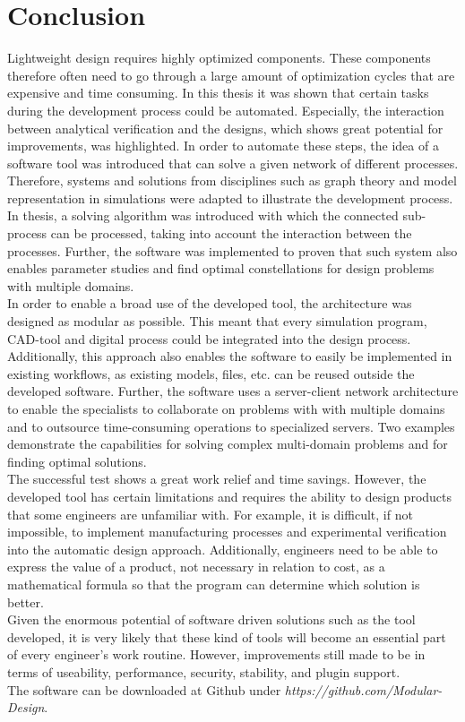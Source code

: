 \section{Conclusion}

Lightweight design requires highly optimized components.
These components therefore often need to go through a large amount of optimization cycles that are expensive and time consuming.
In this thesis it was shown that certain tasks during the development process could be automated.
Especially, the interaction between analytical verification and the designs, which shows great potential for improvements, was highlighted.
In order to automate these steps, the idea of a software tool was introduced that can solve a given network of different processes.
Therefore, systems and solutions from disciplines such as graph theory and model representation in simulations were adapted to illustrate the development process.
In thesis, a solving algorithm was introduced with which the connected sub-process can be processed, taking into account the interaction between the processes.
Further, the software was implemented to proven that such system also enables parameter studies and find optimal constellations for design problems with multiple domains.\\
In order to enable a broad use of the developed tool, the architecture was designed as modular as possible.
This meant that every simulation program, CAD-tool and digital process could be integrated into the design process.
Additionally, this approach also enables the software to easily be implemented in existing workflows, as existing models, files, etc. can be reused outside the developed software.
Further, the software uses a server-client network architecture to enable the specialists to collaborate on problems with with multiple domains and to outsource time-consuming operations to specialized servers.
Two examples demonstrate the capabilities for solving complex multi-domain problems and for finding optimal solutions.\\
The successful test shows a great work relief and time savings.
However, the developed tool has certain limitations and requires the ability to design products that some engineers are unfamiliar with.
For example, it is difficult, if not impossible, to implement manufacturing processes and experimental verification into the automatic design approach.
Additionally, engineers need to be able to express the value of a product, not necessary in relation to cost, as a mathematical formula so that the program can determine which solution is better.\\
Given the enormous potential of software driven solutions such as the tool developed, it is very likely that these kind of tools will become an essential part of every engineer's work routine.
However, improvements still made to be in terms of useability, performance, security, stability, and plugin support.\\

The software can be downloaded at Github under \emph{https://github.com/Modular-Design}.